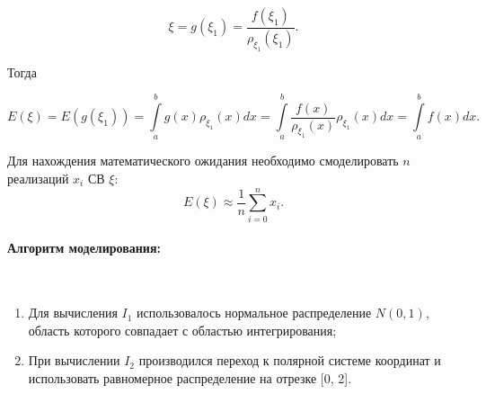 \begin{equation}
	\xi = g(\xi_{1}) = \frac{f(\xi_{1})}{\rho_{\xi_{1}}(\xi_{1})}.
\end{equation}

Тогда

\begin{equation}
	E(\xi) = E(g(\xi_{1})) = \int\limits_{a}^{b}g(x)\rho_{\xi_{1}}(x)dx = \int\limits_{a}^{b}\frac{f(x)}{\rho_{\xi_{1}}(x)}\rho_{\xi_{1}}(x)dx = \int\limits_{a}^{b}f(x)dx.
\end{equation}

Для нахождения математического ожидания необходимо смоделировать $n$ реализаций $x_{i}$ СВ $\xi$:
\begin{equation}
	E(\xi) \approx \frac{1}{n} \sum\limits_{i=0}^{n}x_{i}.
\end{equation}

\paragraph{Алгоритм моделирования:}\
\

\begin{enumerate}
	\item Для вычисления $I_{1}$ использовалось нормальное распределение $N(0,1)$, область которого совпадает с областью интегрирования;
	\item При вычислении $I_{2}$ производился переход к полярной системе координат и использовать равномерное распределение на отрезке [0, 2].
\end{enumerate}
